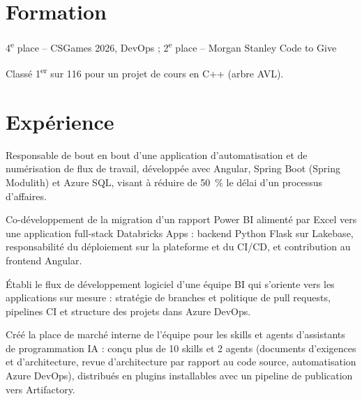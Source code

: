 \documentclass[letterpaper,10pt]{article}
\begin{document}


\section{Formation}

\vspace{-4pt}
\begin{resume_list}
\item 4\textsuperscript{e} place -- CSGames 2026, DevOps ; 2\textsuperscript{e} place -- Morgan Stanley Code to Give
\item Classé 1\textsuperscript{er} sur 116 pour un projet de cours en C++ (arbre AVL). {\footnotesize {}}
\end{resume_list}
\vspace{-4pt}

\section{Expérience}

\begin{resume_list}
\item Responsable de bout en bout d'une application d'automatisation et de numérisation de flux de travail, développée avec Angular, Spring Boot (Spring Modulith) et Azure SQL, visant à réduire de 50~\% le délai d'un processus d'affaires.
\item Co-développement de la migration d'un rapport Power BI alimenté par Excel vers une application full-stack Databricks Apps : backend Python Flask sur Lakebase, responsabilité du déploiement sur la plateforme et du CI/CD, et contribution au frontend Angular.
\item Établi le flux de développement logiciel d'une équipe BI qui s'oriente vers les applications sur mesure : stratégie de branches et politique de pull requests, pipelines CI et structure des projets dans Azure DevOps.
\item Créé la place de marché interne de l'équipe pour les skills et agents d'assistants de programmation IA : conçu plus de 10 skills et 2 agents (documents d'exigences et d'architecture, revue d'architecture par rapport au code source, automatisation Azure DevOps), distribués en plugins installables avec un pipeline de publication vers Artifactory.
\end{resume_list}
\end{document}
